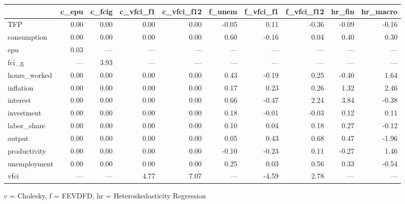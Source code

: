 
\fontsize{12.0pt}{14.4pt}\selectfont
\begin{tabular*}{\linewidth}{@{\extracolsep{\fill}}l|rrrrrrrrr}
\toprule
 & c\_epu & c\_fcig & c\_vfci\_f1 & c\_vfci\_f12 & f\_unem & f\_vfci\_f1 & f\_vfci\_f12 & hr\_fin & hr\_macro \\ 
\midrule\addlinespace[2.5pt]
TFP & 0.00 & 0.00 & 0.00 & 0.00 & -0.05 & 0.11 & -0.36 & -0.09 & -0.16 \\ 
consumption & 0.00 & 0.00 & 0.00 & 0.00 & 0.60 & -0.16 & 0.04 & 0.40 & 0.30 \\ 
epu & 0.03 & — & — & — & — & — & — & — & — \\ 
fci\_g & — & 3.93 & — & — & — & — & — & — & — \\ 
hours\_worked & 0.00 & 0.00 & 0.00 & 0.00 & 0.43 & -0.19 & 0.25 & -0.40 & 1.64 \\ 
inflation & 0.00 & 0.00 & 0.00 & 0.00 & 0.17 & 0.23 & 0.26 & 1.32 & 2.46 \\ 
interest & 0.00 & 0.00 & 0.00 & 0.00 & 0.66 & -0.47 & 2.24 & 3.84 & -0.38 \\ 
investment & 0.00 & 0.00 & 0.00 & 0.00 & 0.18 & -0.01 & -0.03 & 0.12 & 0.11 \\ 
labor\_share & 0.00 & 0.00 & 0.00 & 0.00 & 0.10 & 0.04 & 0.18 & 0.27 & -0.12 \\ 
output & 0.00 & 0.00 & 0.00 & 0.00 & 0.05 & 0.43 & 0.68 & 0.47 & -1.96 \\ 
productivity & 0.00 & 0.00 & 0.00 & 0.00 & -0.10 & -0.23 & 0.11 & -0.27 & 1.46 \\ 
unemployment & 0.00 & 0.00 & 0.00 & 0.00 & 0.25 & 0.03 & 0.56 & 0.33 & -0.54 \\ 
vfci & — & — & 4.77 & 7.07 & — & -4.59 & 2.78 & — & — \\ 
\bottomrule
\end{tabular*}
\begin{minipage}{\linewidth}
c = Cholesky, f = FEVDFD, hr = Heteroskedasticity Regression\\
\end{minipage}


